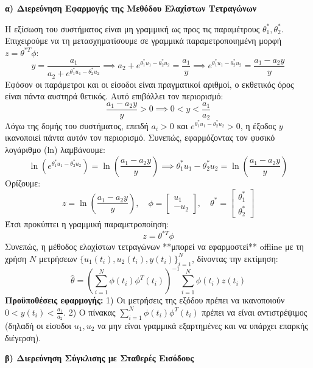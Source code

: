 \documentclass[a4paper,11pt]{article}
\begin{document}
\begin{answer}
\textbf{α) Διερεύνηση Εφαρμογής της Μεθόδου Ελαχίστων Τετραγώνων}

Η εξίσωση του συστήματος είναι μη γραμμική ως προς τις παραμέτρους $\theta_1^*, \theta_2^*$. Επιχειρούμε να τη μετασχηματίσουμε σε γραμμικά παραμετροποιημένη μορφή $z = \theta^{*T} \phi$:
\[ y = \frac{a_1}{a_2 + e^{\theta_1^* u_1 - \theta_2^* u_2}} \implies a_2 + e^{\theta_1^* u_1 - \theta_2^* u_2} = \frac{a_1}{y} \implies e^{\theta_1^* u_1 - \theta_2^* u_2} = \frac{a_1 - a_2 y}{y} \]
Εφόσον οι παράμετροι και οι είσοδοι είναι πραγματικοί αριθμοί, ο εκθετικός όρος είναι πάντα αυστηρά θετικός. Αυτό επιβάλλει τον περιορισμό:
\[ \frac{a_1 - a_2 y}{y} > 0 \implies 0 < y < \frac{a_1}{a_2} \]
Λόγω της δομής του συστήματος, επειδή $a_i > 0$ και $e^{\theta_1^* u_1 - \theta_2^* u_2} > 0$, η έξοδος $y$ ικανοποιεί πάντα αυτόν τον περιορισμό. Συνεπώς, εφαρμόζοντας τον φυσικό λογάριθμο (ln) λαμβάνουμε:
\[ \ln\left( e^{\theta_1^* u_1 - \theta_2^* u_2} \right) = \ln\left( \frac{a_1 - a_2 y}{y} \right) \implies \theta_1^* u_1 - \theta_2^* u_2 = \ln\left( \frac{a_1 - a_2 y}{y} \right) \]
Ορίζουμε:
\[ z = \ln\left( \frac{a_1 - a_2 y}{y} \right), \quad \phi = \begin{bmatrix} u_1 \\ -u_2 \end{bmatrix}, \quad \theta^* = \begin{bmatrix} \theta_1^* \\ \theta_2^* \end{bmatrix} \]
Έτσι προκύπτει η γραμμική παραμετροποίηση:
\[ z = \theta^{*T} \phi \]
Συνεπώς, η μέθοδος ελαχίστων τετραγώνων **μπορεί να εφαρμοστεί** offline με τη χρήση $N$ μετρήσεων $\{u_1(t_i), u_2(t_i), y(t_i)\}_{i=1}^N$, δίνοντας την εκτίμηση:
\[ \hat{\theta} = \left( \sum_{i=1}^N \phi(t_i) \phi^T(t_i) \right)^{-1} \sum_{i=1}^N \phi(t_i) z(t_i) \]
\textbf{Προϋποθέσεις εφαρμογής:}
1) Οι μετρήσεις της εξόδου πρέπει να ικανοποιούν $0 < y(t_i) < \frac{a_1}{a_2}$.
2) Ο πίνακας $\sum_{i=1}^N \phi(t_i) \phi^T(t_i)$ πρέπει να είναι αντιστρέψιμος (δηλαδή οι είσοδοι $u_1, u_2$ να μην είναι γραμμικά εξαρτημένες και να υπάρχει επαρκής διέγερση).

\textbf{β) Διερεύνηση Σύγκλισης με Σταθερές Εισόδους}


\end{answer}
\end{document}
